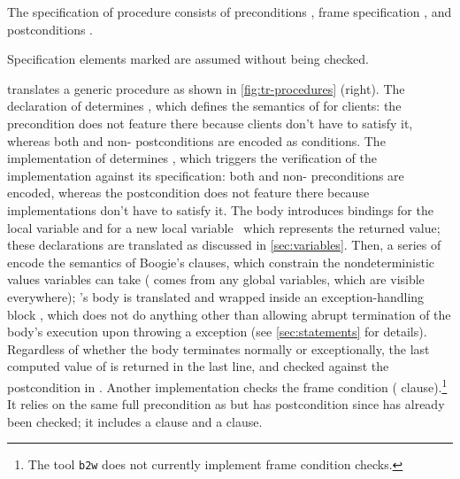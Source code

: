 \documentclass[a4paper,final]{llncs}
\newif\iflong
\newcommand{\btw}{\texttt{b2w}\xspace}
\newcommand{\Boogie}{Boogie\xspace}
\begin{document}
The specification of procedure  consists of preconditions , frame specification , and postconditions .
\iflong
A precondition is an assertion that callers of \B{p} must satisfy upon calling, and that every implementation of \B{p} can assume; \B{free} preconditions need not be satisfied by callers.
A postcondition is an assertion that every implementation of \B{p} must satisfy upon terminating, and that every caller of \B{p} can assume; \B{free} postconditions need not be satisfied by implementations.
Every implementation of \B{p} may only modify the global variables listed in \B{p}'s frame specification.
\else
Specification elements marked  are assumed without being checked.
\fi

 translates a generic procedure  as shown in \autoref{fig:tr-procedures} (right).
The declaration of  determines , which defines the semantics of  for clients: the  precondition  does not feature there because clients don't have to satisfy it, whereas both  and non- postconditions are encoded as  conditions.
The implementation of  determines , which triggers the verification of the implementation against its specification: both  and non- preconditions are encoded, whereas the  postcondition  does not feature there because implementations don't have to satisfy it.
The body introduces  bindings for the local variable  and for a new local variable~ which represents the returned value; these declarations are translated as discussed in \autoref{sec:variables}.
Then, a series of  encode the semantics of \Boogie's  clauses, which constrain the nondeterministic values variables can take ( comes from any global variables, which are visible everywhere); 
's body  is translated and wrapped inside an exception-handling block , which does not do anything other than allowing abrupt termination of the body's execution upon throwing a  exception (see \autoref{sec:statements} for details).
Regardless of whether the body terminates normally or exceptionally, the last computed value of  is returned in the last line, and checked against the postcondition in .
\iflong
Another implementation  checks the frame condition ( clause).\footnote{The tool \btw does not currently implement frame condition checks.}
It relies on the same full precondition as  but has postcondition  since  has already been checked; it includes a  clause and a  clause.
\end{document}
